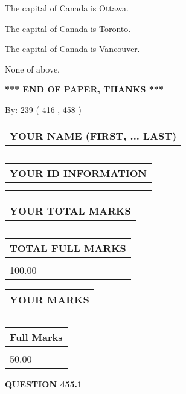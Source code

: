 \documentclass[12pt]{article}
\begin{document}
  
 
 
The capital of Canada is Ottawa.
 
 
The capital of Canada is Toronto.
 
 
The capital of Canada is Vancouver.
 
 
 None of above.
 
 
   
   
\vspace{1.0in} 
{\textbf{\large{ *** END OF PAPER, THANKS *** }}} 
   
   
\hspace{1.0in} By: 
 239 ( 416 ,  458 )
   
   
   
   
\newpage 
\setcounter{page}{ 
   455001 } 
   
   
   
   
\noindent\begin{tabular}{|l|}
\hline
YOUR NAME (FIRST, ... LAST)  \\
\hline
 \\ 
 \\ 
\hline
\end{tabular}
\hspace{0.05in} \begin{tabular}{|l|}
\hline
 YOUR   ID   INFORMATION  \\
\hline
 \\ 
 \\ 
\hline
\end{tabular}
   
   
\vspace{0.2in}\noindent\begin{tabular}{|l|}
\hline
YOUR TOTAL MARKS  \\
\hline
 \\ 
 \\ 
\hline
\end{tabular}
\hspace{0.05in} \begin{tabular}{|l|}
\hline
TOTAL FULL MARKS  \\
\hline
 \\ 
100.00 \\
\hline
\end{tabular}
  
\vspace{0.2in}
  
\noindent\begin{tabular}{|l|}
\hline
 YOUR MARKS  \\
\hline
 \\ 
 \\ 
\hline
\end{tabular}
\hspace{0.05in} \begin{tabular}{|l|}
\hline
 Full Marks  \\
\hline
 \\ 
50.00 \\
\hline
\end{tabular}
{\textbf{\Large{QUESTION
455.1 
}}}
  
\end{document}
